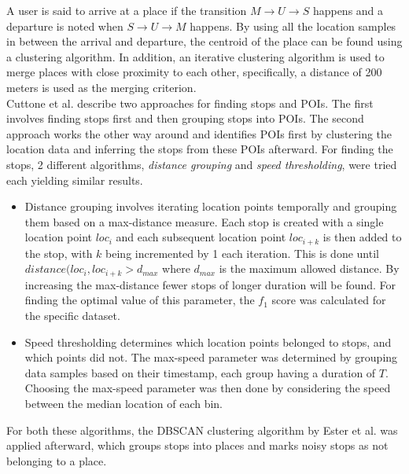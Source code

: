 A user is said to arrive at a place if the transition $M \rightarrow U \rightarrow S$ happens and a departure is noted when $S \rightarrow U \rightarrow M$ happens. By using all the location samples in between the arrival and departure, the centroid of the place can be found using a clustering algorithm. In addition, an iterative clustering algorithm is used to merge places with close proximity to each other, specifically, a distance of 200 meters is used as the merging criterion. \\ 


Cuttone et al. describe two approaches for finding stops and POIs. The first involves finding stops first and then grouping stops into POIs. The second approach works the other way around and identifies POIs first by clustering the location data and inferring the stops from these POIs afterward. For finding the stops, 2 different algorithms, \textit{distance grouping} and \textit{speed thresholding}, were tried each yielding similar results.

\begin{itemize}
    \item Distance grouping involves iterating location points temporally and grouping them based on a max-distance measure. Each stop is created with a single location point $loc_{i}$ and each subsequent location point $loc_{i+k}$ is then added to the stop, with $k$ being incremented by 1 each iteration. This is done until $distance(loc_{i}, loc_{i+k} > d_{max}$ where $d_{max}$ is the maximum allowed distance. By increasing the max-distance fewer stops of longer duration will be found. For finding the optimal value of this parameter, the $f_1$ score was calculated for the specific dataset.  

    \item Speed thresholding determines which location points belonged to stops, and which points did not. The max-speed parameter was determined by grouping data samples based on their timestamp, each group having a duration of $T$. Choosing the max-speed parameter was then done by considering the speed between the median location of each bin.  
\end{itemize}

For both these algorithms, the DBSCAN clustering algorithm by Ester et al. \cite{density-based-1996} was applied afterward, which groups stops into places and marks noisy stops as not belonging to a place.\\

